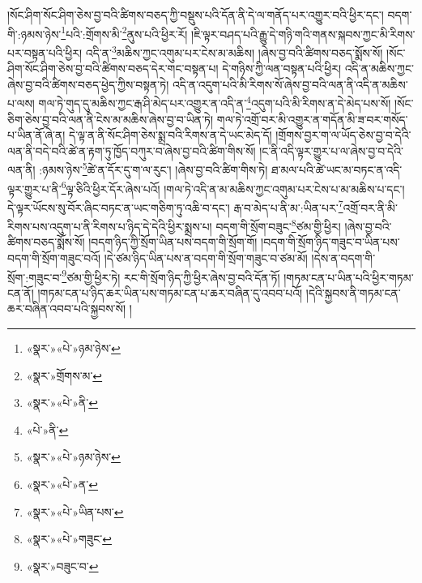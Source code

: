 །སོང་ཤིག་སོང་ཤིག་ཅེས་བྱ་བའི་ཚིགས་བཅད་ཀྱི་བསྡུས་པའི་དོན་ནི་དེ་ལ་གནོད་པར་འགྱུར་བའི་ཕྱིར་དང་། བདག་གི་:ཉམས་ཉེས་\footnote{«སྣར་»«པེ་»ཉམ་ཉེས་}པའི་:གྲོགས་མི་\footnote{«སྣར་»གྲོགས་མ་}ནུས་པའི་ཕྱིར་རོ། །ཇི་ལྟར་བཤད་པའི་རྒྱུ་དེ་གཉི་གའི་གནས་སྐབས་ཀྱང་མི་རིགས་པར་བསྟན་པའི་ཕྱིར། འདི་ན་\footnote{«སྣར་»«པེ་»ནི་}མཆིས་ཀྱང་འགུམ་པར་ངེས་མ་མཆིས། །ཞེས་བྱ་བའི་ཚིགས་བཅད་སྨོས་སོ། །སོང་ཤིག་སོང་ཤིག་ཅེས་བྱ་བའི་ཚིགས་བཅད་དེར་གང་བསྟན་པ། དེ་གཉིས་ཀྱི་ལན་བསྟན་པའི་ཕྱིར། འདི་ན་མཆིས་ཀྱང་ཞེས་བྱ་བའི་ཚིགས་བཅད་ཕྱེད་ཀྱིས་བསྟན་ཏེ། འདི་ན་འདུག་པའི་མི་རིགས་སོ་ཞེས་བྱ་བའི་ལན་ནི་འདི་ན་མཆིས་པ་ལས། གལ་ཏེ་གུད་དུ་མཆིས་ཀྱང་རྒ་ཤི་མེད་པར་འགྱུར་ན་འདི་ན་\footnote{«པེ་»ནི་}འདུག་པའི་མི་རིགས་ན་དེ་མེད་པས་སོ། །སོང་ཅིག་ཅེས་བྱ་བའི་ལན་ནི་ངེས་མ་མཆིས་ཞེས་བྱ་བ་ཡིན་ཏེ། གལ་ཏེ་འགྲོ་བར་མི་འགྱུར་ན་གདོན་མི་ཟ་བར་གསོད་པ་ཡིན་ནོ་ཞེ་ན། དེ་ལྟ་ན་ནི་སོང་ཤིག་ཅེས་སྨྲ་བའི་རིགས་ན་དེ་ཡང་མེད་དོ། །གྲོགས་བྱར་ག་ལ་ཡོད་ཅེས་བྱ་བ་དེའི་ལན་ནི་བདེ་བའི་ཚེ་ན་རྟག་ཏུ་ཁྱོད་བཀུར་བ་ཞེས་བྱ་བའི་ཚིག་གིས་སོ། །ང་ནི་འདི་ལྟར་གྱུར་པ་ལ་ཞེས་བྱ་བ་དེའི་ལན་ནི། :ཉམས་ཉེས་\footnote{«སྣར་»«པེ་»ཉམ་ཉེས་}ཚེ་ན་དོར་དུ་ག་ལ་རུང་། །ཞེས་བྱ་བའི་ཚིག་གིས་ཏེ། ཐ་མལ་པའི་ཚེ་ཡང་མ་བཏང་ན་འདི་ལྟར་གྱུར་པ་ནི་\footnote{«སྣར་»«པེ་»ན་}ལྟ་ཅིའི་ཕྱིར་དོར་ཞེས་པའོ། །གལ་ཏེ་འདི་ན་མ་མཆིས་ཀྱང་འགུམ་པར་ངེས་པ་མ་མཆིས་པ་དང་། དེ་ལྟར་ཡོངས་སུ་བོར་ཞིང་བཏང་ན་ཡང་གཅིག་ཏུ་འཆི་བ་དང་། རྒ་བ་མེད་པ་ནི་མ་:ཡིན་པར་\footnote{«སྣར་»«པེ་»ཡིན་པས་}འགྲོ་བར་ནི་མི་རིགས་པས་འདུག་པ་ནི་རིགས་པ་ཉིད་དེ་དེའི་ཕྱིར་སྨྲས་པ། བདག་གི་སྲོག་བཟུང་\footnote{«སྣར་»«པེ་»གཟུང་}ཙམ་གྱི་ཕྱིར། །ཞེས་བྱ་བའི་ཚིགས་བཅད་སྨོས་སོ། །བདག་ཉིད་ཀྱི་སྲོག་ཡིན་པས་བདག་གི་སྲོག་གོ། །བདག་གི་སྲོག་ཉིད་གཟུང་བ་ཡིན་པས་བདག་གི་སྲོག་གཟུང་བའོ། །དེ་ཙམ་ཉིད་ཡིན་པས་ན་བདག་གི་སྲོག་གཟུང་བ་ཙམ་མོ། །དེས་ན་བདག་གི་སྲོག་:གཟུང་བ་\footnote{«སྣར་»བཟུང་བ་}ཙམ་གྱི་ཕྱིར་ཏེ། རང་གི་སྲོག་ཉིད་ཀྱི་ཕྱིར་ཞེས་བྱ་བའི་དོན་ཏོ། །གཏམ་ངན་པ་ཡིན་པའི་ཕྱིར་གཏམ་ངན་ནོ། །གཏམ་ངན་པ་ཉིད་ཆར་ཡིན་པས་གཏམ་ངན་པ་ཆར་བཞིན་དུ་འབབ་པའོ། །དེའི་སྐྱབས་ནི་གཏམ་ངན་ཆར་བཞིན་འབབ་པའི་སྐྱབས་སོ། །

